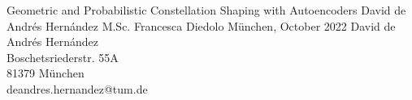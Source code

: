 \documentclass[chair=lnt]{ICEthesis} %
\begin{document}
    {Geometric and Probabilistic Constellation Shaping with Autoencoders}
    {David de Andrés Hernández}
    {M.Sc. Francesca Diedolo}
    {München, October 2022}
    { %
        David de Andrés Hernández\\
        Boschetsriederstr. 55A\\
        81379 München\\
        deandres.hernandez@tum.de
    }


\cleardoubleemptypage %



\setcounter{page}{1}

\tableofcontents
\cleardoubleemptypage


\setcounter{page}{1}







\cleardoubleemptypage



%
%

\printglossary[
    type = acronym,
    title = List of Abbreviations,
    toctitle = List of Abbreviations,
    style = long,
    nonumberlist,
    numberedsection = false,
]

%
%
\printbibliography
\end{document}
